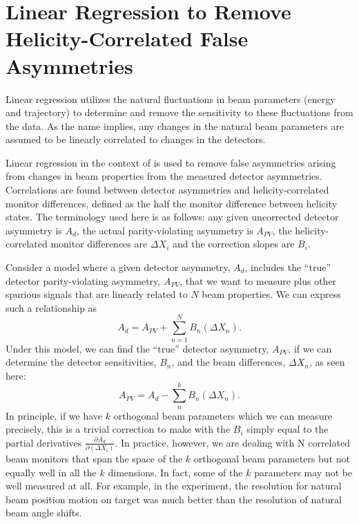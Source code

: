 
\section{\label{sctn:lin_reg}Linear Regression to Remove Helicity-Correlated False Asymmetries}
Linear regression utilizes the natural fluctuations in beam parameters (energy and trajectory) to determine and remove the sensitivity to these fluctuations from the data. As the name implies, any changes in the natural beam parameters are assumed to be linearly correlated to changes in the detectors. 

Linear regression in the context of \Qs is used to remove false asymmetries arising from changes in beam properties from the measured detector asymmetries. Correlations are found between detector asymmetries and helicity-correlated monitor differences, defined as the half the monitor difference between helicity states. The terminology used here is as follows: any given uncorrected detector asymmetry is $A_d$, the actual parity-violating asymmetry is $A_{PV}$, the helicity-correlated monitor differences are $\Delta X_i$ and the correction slopes are $B_i$.


Consider a model where a given detector asymmetry, $A_d$, includes the ``true'' detector parity-violating asymmetry, $A_{PV}$, that we want to measure plus other spurious signals that are linearly related to $N$ beam properties. We can express such a relationship as 
\begin{equation}
A_d=A_{PV} + \sum_{n=1}^N B_n(\Delta X_n).
\label{eq:lin_reg}
\end{equation}
Under this model, we can find the ``true'' detector asymmetry, $A_{PV}$, if we can determine the detector sensitivities, $B_n$, and the beam differences, $\Delta X_n$, as seen here:
\begin{equation}
 A_{PV}= A_d - \sum_n^k B_n(\Delta X_n).
\label{eq:lin_reg_correction}
\end{equation}
In principle, if we have $k$ orthogonal beam parameters which we can measure precisely, this is a trivial correction to make with the $B_i$ simply equal to the partial derivatives $\frac{\partial A_d}{\partial (\Delta X_i)}$. In practice, however, we are dealing with N correlated beam monitors that span the space of the $k$ orthogonal beam parameters but not equally well in all the  $k$ dimensions. In fact, some of the  $k$ parameters may not be well measured at all. For example, in the \Qs experiment, the resolution for natural beam position motion on target was much better than the resolution of natural beam angle shifts.

